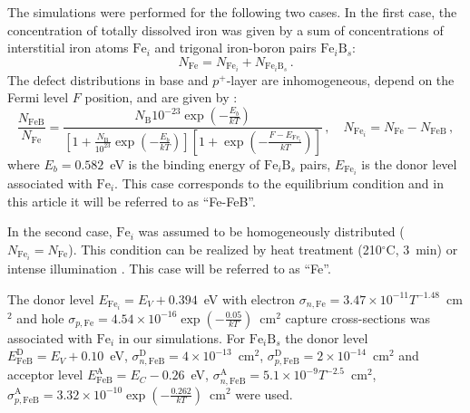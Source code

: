 \documentclass[num-refs]{wiley-article} %
\begin{document}
The simulations were performed for the following two cases.
In the first case, the concentration of totally dissolved iron was given by a sum of
concentrations of interstitial iron atoms $\mathrm{Fe}_i$
and  trigonal iron-boron pairs $\mathrm{Fe}_i\mathrm{B}_s$:
\begin{equation}\label{eqNFeB}
  N_{\mathrm{Fe}}=N_{\mathrm{Fe}_i}+N_{\mathrm{Fe}_i\mathrm{B}_s}\,.
\end{equation}
The defect distributions in base and $p^+$-layer are inhomogeneous, depend on the Fermi level $F$ position, and are given by
\cite{MurphyJAP2011,FeB:kinetic}:
\begin{equation}
\label{eqNFeB}
    \frac{N_{\mathrm{FeB}}}{N_{\mathrm{Fe}}}=\frac{N_\mathrm{B}10^{-23}\exp\left(-\frac{E_b}{kT}\right)}
     {\left[1+\frac{N_\mathrm{B}}{10^{23}}\exp\left(-\frac{E_b}{kT}\right)\right]\left[1+\exp\left(-\frac{F-E_{\mathrm{Fe}_i}}{kT}\right)\right]}\,,
     \quad N_{\mathrm{Fe}_i}=N_{\mathrm{Fe}}-N_{\mathrm{FeB}}\,,
\end{equation}
where
$E_b=0.582$~eV is the binding energy of $\mathrm{Fe}_i\mathrm{B}_s$ pairs,
$E_{\mathrm{Fe}_i}$ is the donor level associated with $\mathrm{Fe}_i$.
This case corresponds to the equilibrium condition and in this article it will be referred to as ``Fe-FeB''.

In the second case, $\mathrm{Fe}_i$ was assumed to be homogeneously distributed ($N_{\mathrm{Fe}_i}=N_{\mathrm{Fe}}$).
This condition can be realized by heat treatment (210$^\circ$C, 3~min) \cite{FeB_Zong}
or intense illumination \cite{FeBLight2}. This case will be referred to as ``Fe''.

The donor level $E_{\mathrm{Fe}_i} = E_V+0.394$~eV
with electron $\sigma_{n,{\mathrm{Fe}}}=3.47\times10^{-11}T^{-1.48}$~cm$^2$ and
hole $\sigma_{p,{\mathrm{Fe}}}=4.54\times10^{-16}\exp\left(-\frac{0.05}{kT}\right)$~cm$^2$ capture cross-sections \cite{MurphyJAP2011,ROUGIEUX2018}
was associated with $\mathrm{Fe}_i$ in our simulations.
For $\mathrm{Fe}_i\mathrm{B}_s$ the donor level $E_{\mathrm{FeB}}^\mathrm{D}= E_V+0.10$~eV,
$\sigma_{n,{\mathrm{FeB}}}^\mathrm{D}=4\times10^{-13}$~cm$^2$,
$\sigma_{p,{\mathrm{FeB}}}^\mathrm{D}=2\times10^{-14}$~cm$^2$
and acceptor level $E_{\mathrm{FeB}}^\mathrm{A}= E_C-0.26$~eV,
$\sigma_{n,{\mathrm{FeB}}}^\mathrm{A}=5.1\times10^{-9}T^{-2.5}$~cm$^2$,
$\sigma_{p,{\mathrm{FeB}}}^\mathrm{A}=3.32\times10^{-10}\exp\left(-\frac{0.262}{kT}\right)$~cm$^2$
\cite{Istratov1999,MurphyJAP2011,ROUGIEUX2018}
were used.
\end{document}
